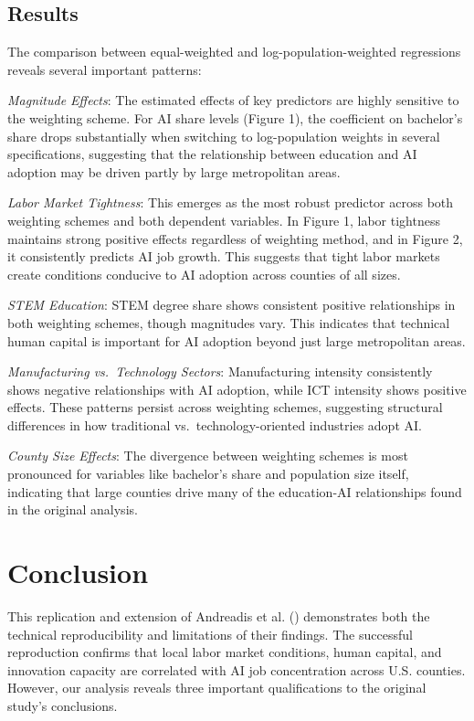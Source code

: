 \documentclass[
]{article}
\begin{document}
\subsection{Results}\label{results}

The comparison between equal-weighted and log-population-weighted
regressions reveals several important patterns:

\emph{Magnitude Effects}: The estimated effects of key predictors are
highly sensitive to the weighting scheme. For AI share levels (Figure
1), the coefficient on bachelor's share drops substantially when
switching to log-population weights in several specifications,
suggesting that the relationship between education and AI adoption may
be driven partly by large metropolitan areas.

\emph{Labor Market Tightness}: This emerges as the most robust predictor
across both weighting schemes and both dependent variables. In Figure 1,
labor tightness maintains strong positive effects regardless of
weighting method, and in Figure 2, it consistently predicts AI job
growth. This suggests that tight labor markets create conditions
conducive to AI adoption across counties of all sizes.

\emph{STEM Education}: STEM degree share shows consistent positive
relationships in both weighting schemes, though magnitudes vary. This
indicates that technical human capital is important for AI adoption
beyond just large metropolitan areas.

\emph{Manufacturing vs.~Technology Sectors}: Manufacturing intensity
consistently shows negative relationships with AI adoption, while ICT
intensity shows positive effects. These patterns persist across
weighting schemes, suggesting structural differences in how traditional
vs.~technology-oriented industries adopt AI.

\emph{County Size Effects}: The divergence between weighting schemes is
most pronounced for variables like bachelor's share and population size
itself, indicating that large counties drive many of the education-AI
relationships found in the original analysis.

\section{Conclusion}\label{conclusion}

This replication and extension of Andreadis et al.
() demonstrates both the technical
reproducibility and limitations of their findings. The successful
reproduction confirms that local labor market conditions, human capital,
and innovation capacity are correlated with AI job concentration across
U.S. counties. However, our analysis reveals three important
qualifications to the original study's conclusions.
\end{document}
